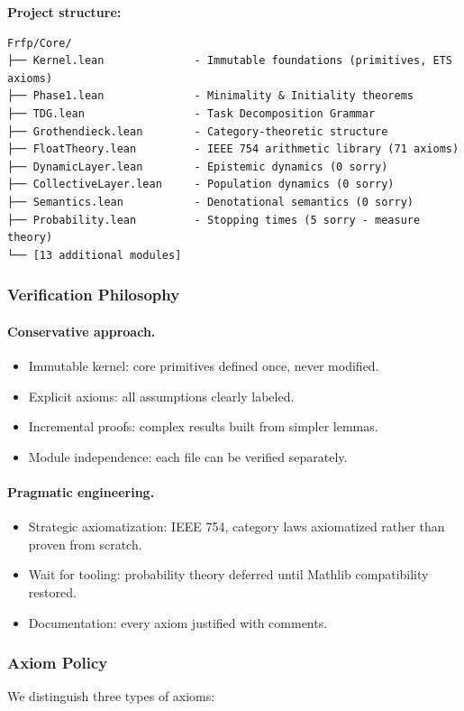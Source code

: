 \textbf{Project structure:}
\begin{verbatim}
Frfp/Core/
├── Kernel.lean              - Immutable foundations (primitives, ETS axioms)
├── Phase1.lean              - Minimality & Initiality theorems
├── TDG.lean                 - Task Decomposition Grammar
├── Grothendieck.lean        - Category-theoretic structure
├── FloatTheory.lean         - IEEE 754 arithmetic library (71 axioms)
├── DynamicLayer.lean        - Epistemic dynamics (0 sorry)
├── CollectiveLayer.lean     - Population dynamics (0 sorry)
├── Semantics.lean           - Denotational semantics (0 sorry)
├── Probability.lean         - Stopping times (5 sorry - measure theory)
└── [13 additional modules]
\end{verbatim}

\subsubsection{Verification Philosophy}
\paragraph{Conservative approach.}
\begin{itemize}
  \item Immutable kernel: core primitives defined once, never modified.
  \item Explicit axioms: all assumptions clearly labeled.
  \item Incremental proofs: complex results built from simpler lemmas.
  \item Module independence: each file can be verified separately.
\end{itemize}

\paragraph{Pragmatic engineering.}
\begin{itemize}
  \item Strategic axiomatization: IEEE 754, category laws axiomatized rather than proven from scratch.
  \item Wait for tooling: probability theory deferred until Mathlib compatibility restored.
  \item Documentation: every axiom justified with comments.
\end{itemize}

\subsubsection{Axiom Policy}
We distinguish three types of axioms:

